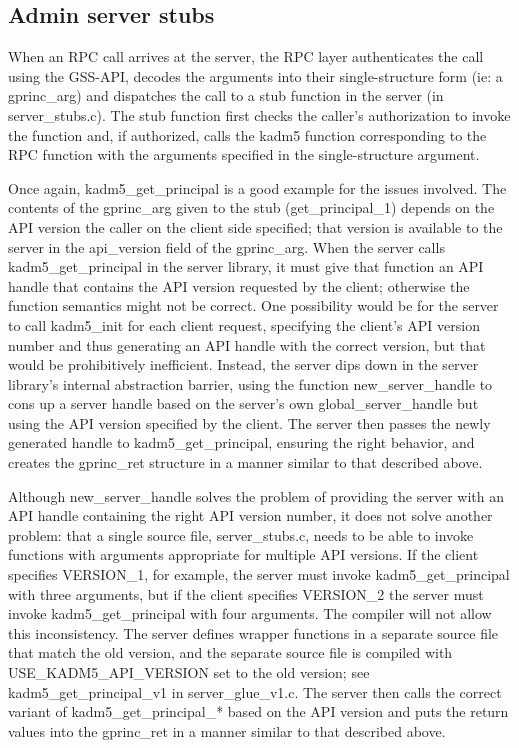 \subsection{Admin server stubs}

When an RPC call arrives at the server, the RPC layer authenticates
the call using the GSS-API, decodes the arguments into their
single-structure form (ie: a gprinc_arg) and dispatches the call to a
stub function in the server (in server_stubs.c).  The stub function
first checks the caller's authorization to invoke the function and, if
authorized, calls the kadm5 function corresponding to the RPC function
with the arguments specified in the single-structure argument.

Once again, kadm5_get_principal is a good example for the issues
involved.  The contents of the gprinc_arg given to the stub
(get_principal_1) depends on the API version the caller on the client
side specified; that version is available to the server in the
api_version field of the gprinc_arg.  When the server calls
kadm5_get_principal in the server library, it must give that function
an API handle that contains the API version requested by the client;
otherwise the function semantics might not be correct.  One
possibility would be for the server to call kadm5_init for each client
request, specifying the client's API version number and thus generating
an API handle with the correct version, but that would be
prohibitively inefficient.  Instead, the server dips down in the
server library's internal abstraction barrier, using the function
new_server_handle to cons up a server handle based on the server's own
global_server_handle but using the API version specified by the
client.  The server then passes the newly generated handle to
kadm5_get_principal, ensuring the right behavior, and creates the
gprinc_ret structure in a manner similar to that described above.

Although new_server_handle solves the problem of providing the server
with an API handle containing the right API version number, it does
not solve another problem: that a single source file, server_stubs.c,
needs to be able to invoke functions with arguments appropriate for
multiple API versions.  If the client specifies VERSION_1, for
example, the server must invoke kadm5_get_principal with three
arguments, but if the client specifies VERSION_2 the server must
invoke kadm5_get_principal with four arguments.  The compiler will not
allow this inconsistency.  The server defines wrapper functions in a
separate source file that match the old version, and the separate
source file is compiled with USE_KADM5_API_VERSION set to the old
version; see kadm5_get_principal_v1 in server_glue_v1.c.  The server
then calls the correct variant of kadm5_get_principal_* based on the
API version and puts the return values into the gprinc_ret in a manner
similar to that described above.

